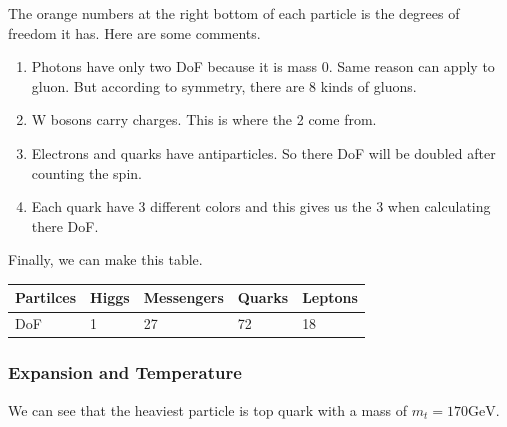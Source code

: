 \documentclass[letterpaper,10pt,english]{sphinxmanual}
\begin{document}
{The orange numbers at the right bottom of each particle is the degrees of freedom it has. Here are some comments.
\begin{enumerate}
\item {} 
Photons have only two DoF because it is mass 0. Same reason can apply to gluon. But according to symmetry, there are 8 kinds of gluons.

\item {} 
W bosons carry charges. This is where the 2 come from.

\item {} 
Electrons and quarks have antiparticles. So there DoF will be doubled after counting the spin.

\item {} 
Each quark have 3 different colors and this gives us the 3 when calculating there DoF.

\end{enumerate}

Finally, we can make this table.

\begin{tabulary}{\linewidth}{|L|L|L|L|L|}
\hline
\textsf{\relax 
Partilces
} & \textsf{\relax 
Higgs
} & \textsf{\relax 
Messengers
} & \textsf{\relax 
Quarks
} & \textsf{\relax 
Leptons
}\\
\hline
DoF
 & 
1
 & 
27
 & 
72
 & 
18
\\
\hline\end{tabulary}



\subsubsection{Expansion and Temperature}
\label{Cosmology/cosmoIndex:expansion-and-temperature}
We can see that the heaviest particle is top quark with a mass of $m_t = 170 \mathrm{GeV}$.


}
\end{document}
